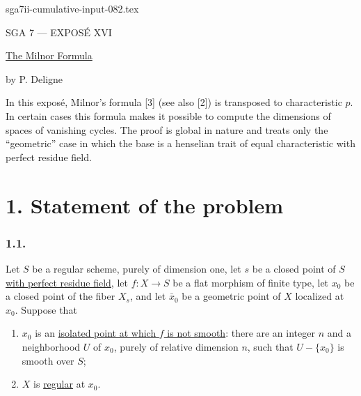 \begin{filecontents*}{sga7ii-cumulative-input-082.tex}
\clearpage
\begin{center}
{\large SGA 7 --- EXPOS\'E XVI}\par
\vspace{2em}
{\Large\underline{The Milnor Formula}}\par
\vspace{1.5em}
{\large by P. Deligne}
\end{center}

\medskip
In this expos\'e, Milnor's formula [3] (see also [2]) is transposed
to characteristic $p$.  In certain cases this formula makes it
possible to compute the dimensions of spaces of vanishing cycles.
The proof is global in nature and treats only the ``geometric'' case
in which the base is a henselian trait of equal characteristic with
perfect residue field.

\section*{1. Statement of the problem}

\subsubsection*{1.1.}
Let $S$ be a regular scheme, purely of dimension one, let $s$ be a
closed point of $S$ \underline{with perfect residue field}, let
$f:X\to S$ be a flat morphism of finite type, let $x_0$ be a closed
point of the fiber $X_s$, and let $\bar x_0$ be a geometric point of
$X$ localized at $x_0$.  Suppose that
\begin{enumerate}
\item[(a)] $x_0$ is an \underline{isolated point at which $f$ is not
smooth}: there are an integer $n$ and a neighborhood $U$ of $x_0$,
purely of relative dimension $n$, such that $U-\{x_0\}$ is smooth
over $S$;
\item[(b)] $X$ is \underline{regular} at $x_0$.
\end{enumerate}


\end{filecontents*}
